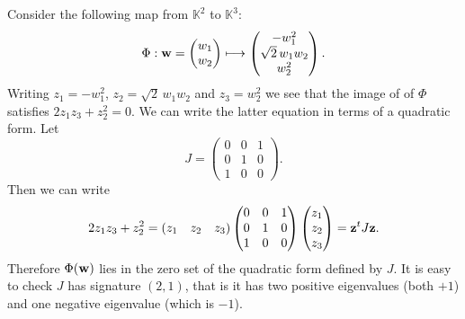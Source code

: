 \documentclass[11pt]{amsart}
\numberwithin{equation}{section}
\begin{document}
Consider the following map from ${\mathbb K}^2$ to ${\mathbb K}^3$:
$$
\Phi:{\bf w}=\left(\begin{matrix} w_1 \\ w_2 \end{matrix}\right) \longmapsto 
\left(\begin{matrix} -w_1^2 \\ \sqrt{2}\,w_1w_2 \\ w_2^2 \end{matrix}\right).
$$
Writing $z_1=-w_1^2$, $z_2=\sqrt{2}\,w_1w_2$ and $z_3=w_2^2$ we see that the image of of $\Phi$ satisfies
$2z_1z_3+z_2^2=0$. We can write the latter equation in terms of a quadratic form.
Let 
\begin{equation}\label{eq:J}
J=\left(\begin{matrix} 0 & 0 & 1 \\ 0 & 1 & 0 \\ 1 & 0 & 0 \end{matrix}\right).
\end{equation}
Then we can write
$$
2z_1z_3+z_2^2=(\begin{matrix} z_1 & z_2 & z_3 \end{matrix})
\left(\begin{matrix} 0 & 0 & 1 \\ 0 & 1 & 0 \\ 1 & 0 & 0 \end{matrix}\right)
\left(\begin{matrix} z_1 \\ z_2 \\ z_3 \end{matrix}\right) ={\bf z}^t J{\bf z}.
$$
Therefore $\Phi({\bf w})$ lies in the zero set of the quadratic form defined by $J$. It is easy to check $J$ has 
signature $(2,1)$, that is it has two positive eigenvalues (both $+1$) and one negative eigenvalue (which is $-1$).
\end{document}

